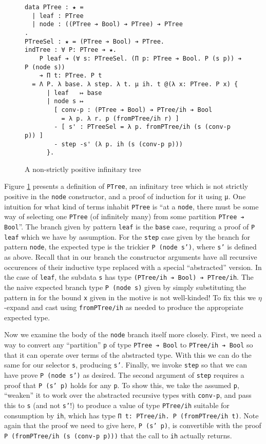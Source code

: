 \documentclass{article}
\begin{document}
\begin{figure}[h]
\begin{verbatim}
data PTree : ★ =
  | leaf : PTree
  | node : ((PTree ➔ Bool) ➔ PTree) ➔ PTree
.
PTreeSel : ★ = (PTree ➔ Bool) ➔ PTree.
indTree : ∀ P: PTree ➔ ★.
    P leaf ➔ (∀ s: PTreeSel. (Π p: PTree ➔ Bool. P (s p)) ➔ P (node s))
    ➔ Π t: PTree. P t
  = Λ P. λ base. λ step. λ t. μ ih. t @(λ x: PTree. P x) {
      | leaf   ↦ base
      | node s ↦
        [ conv-p : (PTree ➔ Bool) ➔ PTree/ih ➔ Bool
          = λ p. λ r. p (fromPTree/ih r) ]
        - [ s' : PTreeSel = λ p. fromPTree/ih (s (conv-p p)) ]
        - step -s' (λ p. ih (s (conv-p p)))
      }.
\end{verbatim}
  \caption{A non-strictly positive infinitary tree}
  \label{fig:ptree}
\end{figure}

Figure \ref{fig:ptree} presents a definition of \texttt{PTree}, an infinitary
tree which is not strictly positive in the \texttt{node} constructor, and a
proof of induction for it using μ. One intuition for what kind of terms inhabit
\texttt{PTree} is ``at a \texttt{node}, there must be some way of selecting one
\texttt{PTree} (of infinitely many) from some partition \texttt{PTree ➔ Bool}''.
The branch given by pattern \texttt{leaf} is the \texttt{base} case, requring a
proof of \texttt{P leaf} which we have by assumption. For the \texttt{step} case
given by the branch for pattern \texttt{node}, the expected type is the trickier
\texttt{P (node s')}, where \texttt{s'} is defined as above. Recall that in our
branch the constructor arguments have all recursive occurences of their
inductive type replaced with a special ``abstracted'' version. In the case of
\texttt{leaf}, the subdata \texttt{s} has type \texttt{(PTree/ih ➔ Bool) ➔
PTree/ih}. The the naive expected branch type \texttt{P (node s)} given by
simply substituting the pattern in for the bound \texttt{x} given in the motive
is not well-kinded! To fix this we $\eta$-expand and cast using \texttt{fromPTree/ih}
as needed to produce the appropriate expected type.

Now we examine the body of the \texttt{node} branch itself more closely. First,
we need a way to convert any ``partition'' \texttt{p} of type \texttt{PTree ➔
  Bool} to \texttt{PTree/ih ➔ Bool} so that it can operate over terms of the abstracted
type. With this we can do the same for our selector \texttt{s}, producing
\texttt{s'}. Finally, we invoke \texttt{step} so that we can have prove
\texttt{P (node s')} as desired. The second argument of \texttt{step} requires a
proof that \texttt{P (s' p)} holds for any \texttt{p}. To show this, we take the
assumed \texttt{p}, ``weaken'' it to work over the abstracted recursive types
with \texttt{conv-p}, and pass this to \texttt{s} (and not \texttt{s'}!) to
produce a value of type \texttt{PTree/ih} suitable for consumption by
\texttt{ih}, which has type \texttt{Π t: PTree/ih. P (fromPTree/ih t)}. Note
again that the proof we need to give here, \texttt{P (s' p)}, is convertible
with the proof \texttt{P (fromPTree/ih (s (conv-p p)))} that the call to
\texttt{ih} actually returns.
\end{document}
